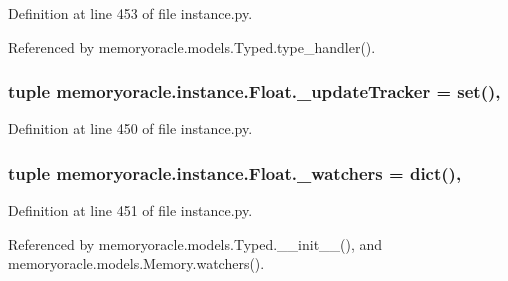 Definition at line 453 of file instance.\+py.



Referenced by memoryoracle.\+models.\+Typed.\+type\+\_\+handler().

\hypertarget{classmemoryoracle_1_1instance_1_1Float_a2de362a0f4b3b80cfcb0ad7d09cd1462}{}
\subsubsection[{\+\_\+update\+Tracker}]{\setlength{\rightskip}{0pt plus 5cm}tuple memoryoracle.\+instance.\+Float.\+\_\+update\+Tracker = set()\hspace{0.3cm}{\ttfamily [static]}, {\ttfamily [private]}}\label{classmemoryoracle_1_1instance_1_1Float_a2de362a0f4b3b80cfcb0ad7d09cd1462}


Definition at line 450 of file instance.\+py.

\hypertarget{classmemoryoracle_1_1instance_1_1Float_a41aab3bf3c399c2a8762081fc3b326ee}{}
\subsubsection[{\+\_\+watchers}]{\setlength{\rightskip}{0pt plus 5cm}tuple memoryoracle.\+instance.\+Float.\+\_\+watchers = dict()\hspace{0.3cm}{\ttfamily [static]}, {\ttfamily [private]}}\label{classmemoryoracle_1_1instance_1_1Float_a41aab3bf3c399c2a8762081fc3b326ee}


Definition at line 451 of file instance.\+py.



Referenced by memoryoracle.\+models.\+Typed.\+\_\+\+\_\+init\+\_\+\+\_\+(), and memoryoracle.\+models.\+Memory.\+watchers().

\hypertarget{classmemoryoracle_1_1instance_1_1Float_a95b3997824e3c9223128f07ef7c69a19}{}
